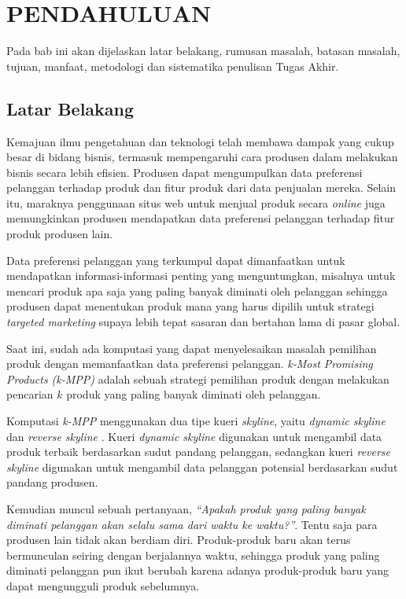 \chapter{PENDAHULUAN}
\tab Pada bab ini akan dijelaskan latar belakang, rumusan masalah, batasan masalah, tujuan, manfaat, metodologi dan sistematika penulisan Tugas Akhir.

\section{Latar Belakang}
\tab Kemajuan ilmu pengetahuan dan teknologi telah membawa dampak yang cukup besar di bidang bisnis, termasuk mempengaruhi cara produsen dalam melakukan bisnis secara lebih efisien. Produsen dapat mengumpulkan data preferensi pelanggan terhadap produk dan fitur produk dari data penjualan mereka. Selain itu, maraknya penggunaan situs web untuk menjual produk secara \textit{online} juga memungkinkan produsen mendapatkan data preferensi pelanggan terhadap fitur produk produsen lain.

Data preferensi pelanggan yang terkumpul dapat dimanfaatkan untuk mendapatkan informasi-informasi penting yang menguntungkan, misalnya untuk mencari produk apa saja yang paling banyak diminati oleh pelanggan sehingga produsen dapat menentukan produk mana yang harus dipilih untuk strategi \textit{targeted marketing} supaya lebih tepat sasaran dan bertahan lama di pasar global.

Saat ini, sudah ada komputasi yang dapat menyelesaikan masalah pemilihan
produk dengan memanfaatkan data preferensi pelanggan. \textit{k-Most Promising Products (k-MPP)} \cite{kmpp} adalah sebuah strategi pemilihan produk dengan melakukan pencarian $k$ produk yang paling banyak diminati oleh pelanggan.

Komputasi \textit{k-MPP} menggunakan dua tipe kueri \textit{skyline}, yaitu \textit{dynamic skyline} \cite{dynamic-skyline} dan \textit{reverse skyline} \cite{reverse-skyline}. Kueri \textit{dynamic skyline} digunakan untuk mengambil data produk terbaik berdasarkan sudut pandang pelanggan, sedangkan kueri \textit{reverse skyline} digunakan untuk mengambil data pelanggan potensial berdasarkan sudut pandang produsen.

Kemudian muncul sebuah pertanyaan, \textit{“Apakah produk yang paling banyak diminati pelanggan akan selalu sama dari waktu ke waktu?”}. Tentu saja para produsen lain tidak akan berdiam diri. Produk-produk baru akan terus bermunculan seiring dengan berjalannya waktu, sehingga produk yang paling diminati pelanggan pun ikut berubah karena adanya produk-produk baru yang dapat mengungguli produk sebelumnya.


